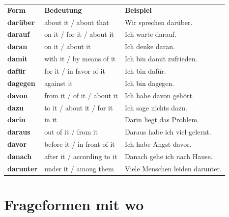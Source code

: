 \documentclass[a4paper,11pt]{article}
\begin{document}
        \begin{tabular}{>{\bfseries}p{3cm} p{4cm} p{7cm}}
            \rowcolor{HeaderBlueDark}
            \color{white}\textbf{Form} & \color{white}\textbf{Bedeutung} & \color{white}\textbf{Beispiel}  \\
            darüber                    & about it / about that           & Wir sprechen darüber.           \\
            darauf                     & on it / for it / about it       & Ich warte darauf.               \\
            daran                      & on it / about it                & Ich denke daran.                \\
            damit                      & with it / by means of it        & Ich bin damit zufrieden.        \\
            dafür                      & for it / in favor of it         & Ich bin dafür.                  \\
            dagegen                    & against it                      & Ich bin dagegen.                \\
            davon                      & from it / of it / about it      & Ich habe davon gehört.          \\
            dazu                       & to it / about it / for it       & Ich sage nichts dazu.           \\
            darin                      & in it                           & Darin liegt das Problem.        \\
            daraus                     & out of it / from it             & Daraus habe ich viel gelernt.   \\
            davor                      & before it / in front of it      & Ich habe Angst davor.           \\
            danach                     & after it / according to it      & Danach gehe ich nach Hause.     \\
            darunter                   & under it / among them           & Viele Menschen leiden darunter. \\
        \end{tabular}
    
    
    \section{Frageformen mit wo}
        
\end{document}
